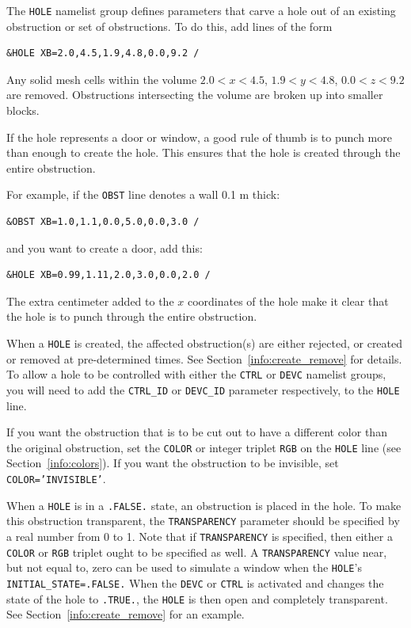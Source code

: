 \documentclass[11pt]{book}
\newcommand{\ct}{\tt\small}
\begin{document}
The {\ct HOLE} namelist group defines parameters that carve a hole
out of an existing obstruction or set of obstructions. To do this, add lines of the form

\footnotesize
\begin{verbatim}
&HOLE XB=2.0,4.5,1.9,4.8,0.0,9.2 /
\end{verbatim}
\normalsize
Any solid mesh cells within the volume $2.0<x<4.5$, $1.9<y<4.8$,
$0.0<z<9.2$ are removed. Obstructions intersecting the volume are
broken up into smaller blocks.

\begin{notebox}
\noindent
If the hole represents a door or window, a good rule of thumb is to punch more than enough to create the hole.
This ensures that the hole is created through the entire obstruction.
\end{notebox}

\noindent
For example, if the {\ct OBST} line denotes a wall 0.1 m thick:

\footnotesize
\begin{verbatim}
&OBST XB=1.0,1.1,0.0,5.0,0.0,3.0 /
\end{verbatim}
\normalsize
and you want to create a door, add this:

\footnotesize
\begin{verbatim}
&HOLE XB=0.99,1.11,2.0,3.0,0.0,2.0 /
\end{verbatim}
\normalsize
The extra centimeter added to the $x$ coordinates of the hole make it clear
that the hole is to punch through the entire obstruction.

When a {\ct HOLE} is created, the affected obstruction(s) are either rejected, or
created or removed at pre-determined times. See Section~\ref{info:create_remove} for details.
To allow a hole to be controlled with either the {\ct CTRL} or {\ct DEVC} namelist groups, you will need to add the {\ct CTRL\_ID} or {\ct DEVC\_ID}
parameter respectively, to the {\ct HOLE} line.

If you want the obstruction that is to be cut out to have a different color
than the original obstruction, set the {\ct COLOR} or integer triplet
{\ct RGB} on the {\ct HOLE} line (see Section~\ref{info:colors}). If you want the obstruction to be invisible, set {\ct COLOR='INVISIBLE'}.

When a {\ct HOLE} is in a {\ct .FALSE.} state, an obstruction is placed in the hole.
To make this obstruction transparent, the {\ct TRANSPARENCY} parameter should be specified by
a real number from 0 to 1. Note that if {\ct TRANSPARENCY} is specified, then either a {\ct COLOR} or {\ct RGB} triplet ought to be specified as well.
A {\ct TRANSPARENCY} value near, but not equal to, zero can be used to simulate a window when the {\ct HOLE}'s {\ct INITIAL\_STATE=.FALSE.} When the {\ct DEVC} or {\ct CTRL}
is activated and changes the state of the hole to {\ct .TRUE.}, the {\ct HOLE} is then open and completely transparent.
See Section~\ref{info:create_remove} for an example.
\end{document}
